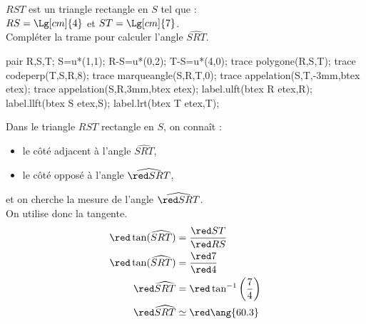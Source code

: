 \begin{corrige}
    $RST$ est un triangle rectangle en $S$ tel que :\\$RS=\Lg[cm]{4}$ et $ST=\Lg[cm]{7}$.\\
    Compléter la trame pour calculer l'angle $\widehat{SRT}$.
    \begin{center}
        \begin{Geometrie}[CoinHD={(5.5u,3.5u)}]        
            pair R,S,T;
            S=u*(1,1);
            R-S=u*(0,2);
            T-S=u*(4,0);
            trace polygone(R,S,T);
            trace codeperp(T,S,R,8);
            trace marqueangle(S,R,T,0);
            trace appelation(S,T,-3mm,btex  etex);
            trace appelation(S,R,3mm,btex  etex);
            label.ulft(btex R etex,R);
            label.llft(btex S etex,S);
            label.lrt(btex T etex,T);
        \end{Geometrie}
    \end{center}
    Dans le triangle $RST$ {\red rectangle} en {\red $S$}, on connaît :
    \begin{itemize}        
        \item le côté {\red adjacent} à l'angle $\widehat{SRT}$,
        \item le côté {\red opposé} à l'angle $\widehat{\red SRT}$,
    \end{itemize}
    et on cherche la mesure de l'angle $\widehat{\red SRT}$.\\ On utilise donc {\red la tangente}.
    \begin{align*}
        {\red \tan(\widehat{SRT})}&=\frac{\red ST}{\red RS}\\        
        {\red \tan(\widehat{SRT})}&=\frac{\red 7}{\red 4}\\                
        {\red \widehat{SRT}}&={\red \tan^{-1}\left(\frac{7}{4}\right)}\\
        {\red \widehat{SRT}}&\simeq {\red\ang{60.3}}
    \end{align*}
\end{corrige}

